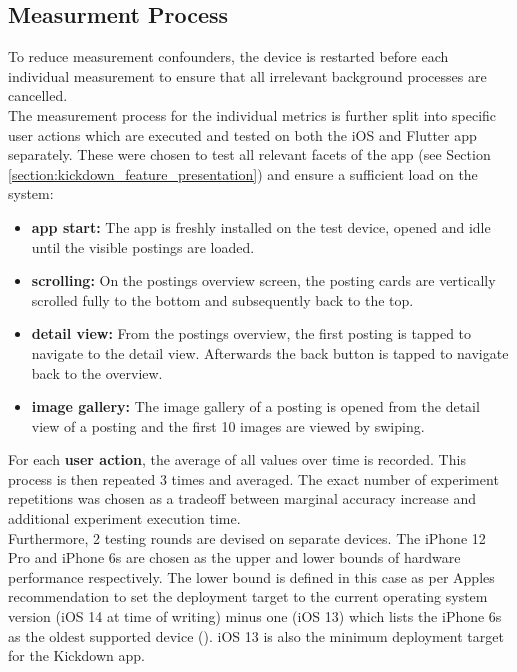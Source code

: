 \subsection{Measurment Process} \label{subsection::measurement_process}
To reduce measurement confounders, the device is restarted before each individual measurement to ensure that all
irrelevant background processes are cancelled.\\
The measurement process for the individual metrics is further split into specific user actions
which are executed and tested on both the iOS and Flutter app separately. These were chosen
to test all relevant facets of the app (see Section \ref{section:kickdown_feature_presentation}) and ensure a sufficient load on the system:
\begin{itemize}
    \item \textbf{app start:} The app is freshly installed on the test device, opened and idle until the visible postings are loaded.
    \item \textbf{scrolling:} On the postings overview screen, the posting cards are vertically scrolled fully to the bottom and subsequently back to the top.
    \item \textbf{detail view:} From the postings overview, the first posting is tapped to navigate to the detail view. Afterwards the back button is tapped to navigate back to the overview.
    \item \textbf{image gallery:} The image gallery of a posting is opened from the detail view of a posting and the first 10 images are viewed by swiping.
\end{itemize}
For each \textbf{user action}, the average of all values over time is recorded. This process is then
repeated 3 times and averaged. The exact number of experiment repetitions was chosen as a
tradeoff between marginal accuracy increase and additional experiment execution time.\\
Furthermore, 2 testing rounds are devised on separate devices. The iPhone 12 Pro and iPhone
6s are chosen as the upper and lower bounds of hardware performance respectively. The lower
bound is defined in this case as per Apples recommendation to set the deployment target to the
current operating system version (iOS 14 at time of writing) minus one (iOS 13) which lists the
iPhone 6s as the oldest supported device (\cite{Apple2021}). iOS 13 is also the minimum deployment target for the Kickdown app.\\

